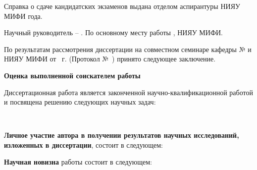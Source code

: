    Справка о сдаче кандидатских экзаменов выдана отделом аспирантуры НИЯУ МИФИ  года.

    Научный руководитель –  . По основному месту работы ,  НИЯУ МИФИ.

    По результатам рассмотрения диссертации  на совместном семинаре кафедры №  и  НИЯУ МИФИ от ~г. (Протокол №~) принято следующее заключение.

      \vspace{3mm}
    
    \textbf{Оценка выполненной соискателем работы}
    
    \vspace{3mm}

    Диссертационная работа   является законченной научно-квалификационной работой и посвящена решению следующих научных задач: 

    \begin{enumerate}
        {%
            \item {}\
        }
    \end{enumerate}

    \vspace{3mm}

    \textbf{Личное участие автора в получении результатов научных исследований, изложенных в диссертации}, состоит в следующем:

    
    \vspace{3mm}

    \textbf{Научная новизна} работы состоит в следующем:

    \vspace{3mm}

    \begin{enumerate}
        {%
            \item {}\
        }
    \end{enumerate}

